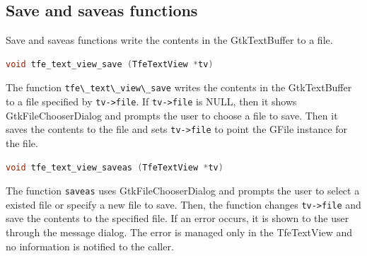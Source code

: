 \hypertarget{save-and-saveas-functions}{%
\subsection{Save and saveas functions}\label{save-and-saveas-functions}}

Save and saveas functions write the contents in the GtkTextBuffer to a
file.

\begin{lstlisting}[language=C]
void tfe_text_view_save (TfeTextView *tv)
\end{lstlisting}

The function \passthrough{\lstinline!tfe\_text\_view\_save!} writes the
contents in the GtkTextBuffer to a file specified by
\passthrough{\lstinline!tv->file!}. If
\passthrough{\lstinline!tv->file!} is NULL, then it shows
GtkFileChooserDialog and prompts the user to choose a file to save. Then
it saves the contents to the file and sets
\passthrough{\lstinline!tv->file!} to point the GFile instance for the
file.

\begin{lstlisting}[language=C]
void tfe_text_view_saveas (TfeTextView *tv)
\end{lstlisting}

The function \passthrough{\lstinline!saveas!} uses GtkFileChooserDialog
and prompts the user to select a existed file or specify a new file to
save. Then, the function changes \passthrough{\lstinline!tv->file!} and
save the contents to the specified file. If an error occurs, it is shown
to the user through the message dialog. The error is managed only in the
TfeTextView and no information is notified to the caller.

